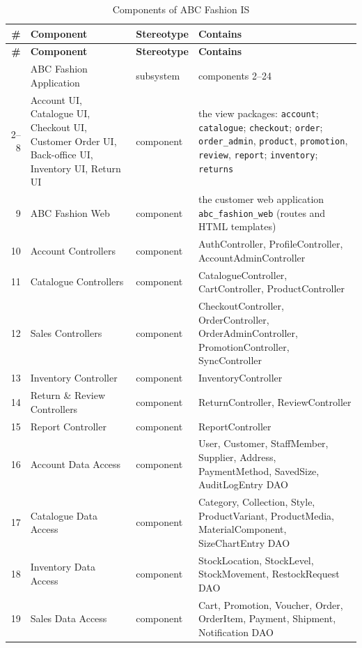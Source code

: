 {\small
\begin{xltabular}{\textwidth}{@{}r L{4.2cm} L{2.4cm} Y@{}}
\caption{Components of ABC Fashion IS}\label{tab:components}\\
\toprule
\textbf{\#} & \textbf{Component} & \textbf{Stereotype} & \textbf{Contains} \\ \midrule
\endfirsthead
\toprule
\textbf{\#} & \textbf{Component} & \textbf{Stereotype} & \textbf{Contains} \\ \midrule
\endhead
\bottomrule
{} & ABC Fashion Application & subsystem & components 2--24 \\
2--8 & Account UI, Catalogue UI, Checkout UI, Customer Order UI, Back-office UI, Inventory UI, Return UI & component & the view packages: \texttt{account}; \texttt{catalogue}; \texttt{checkout}; \texttt{order}; \texttt{order\_admin}, \texttt{product}, \texttt{promotion}, \texttt{review}, \texttt{report}; \texttt{inventory}; \texttt{returns} \\
9 & ABC Fashion Web & component & the customer web application \texttt{abc\_fashion\_web} (routes and HTML templates) \\
10 & Account Controllers & component & \textsf{AuthController}, \textsf{ProfileController}, \textsf{AccountAdminController} \\
11 & Catalogue Controllers & component & \textsf{CatalogueController}, \textsf{CartController}, \textsf{ProductController} \\
12 & Sales Controllers & component & \textsf{CheckoutController}, \textsf{OrderController}, \textsf{OrderAdminController}, \textsf{PromotionController}, \textsf{SyncController} \\
13 & Inventory Controller & component & \textsf{InventoryController} \\
14 & Return \& Review Controllers & component & \textsf{ReturnController}, \textsf{ReviewController} \\
15 & Report Controller & component & \textsf{ReportController} \\
16 & Account Data Access & component & User, Customer, StaffMember, Supplier, Address, PaymentMethod, SavedSize, AuditLogEntry DAO \\
17 & Catalogue Data Access & component & Category, Collection, Style, ProductVariant, ProductMedia, MaterialComponent, SizeChartEntry DAO \\
18 & Inventory Data Access & component & StockLocation, StockLevel, StockMovement, RestockRequest DAO \\
19 & Sales Data Access & component & Cart, Promotion, Voucher, Order, OrderItem, Payment, Shipment, Notification DAO \\

\end{xltabular}}
